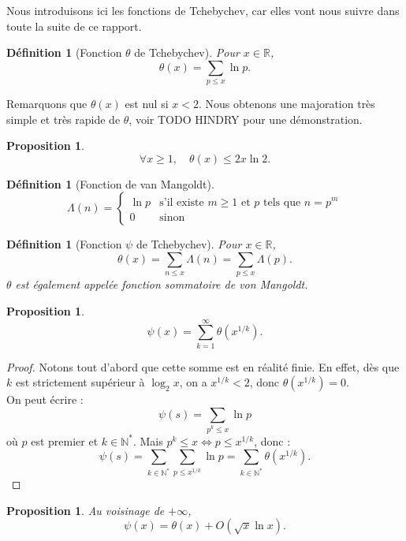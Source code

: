 \documentclass[french]{report}
\newtheorem{definition}[theorem]{Définition}
\newtheorem{proposition}[theorem]{Proposition}
\begin{document}
Nous introduisons ici les fonctions de Tchebychev, car elles vont nous suivre dans toute la suite de ce rapport.

\begin{definition}[Fonction $\theta$ de Tchebychev] Pour $x\in \mathbb{R}$,
  \[ \theta(x) = \sum_{p \le x}\ln p. \]
\end{definition}

Remarquons que $\theta(x)$ est nul si $x<2$. Nous obtenons une majoration très simple et très rapide de $\theta$, voir TODO HINDRY pour une démonstration.

\begin{proposition}\label{prop:theta-majoration}
  \[
    \forall x\geq1,\quad \theta(x)\leq 2x\ln 2.
  \]
\end{proposition}

\begin{definition}[Fonction de van Mangoldt]
  \[
    \Lambda(n)=
    \begin{cases}
      \ln p & \text{s'il existe $m\geq1$ et $p$ tels que $n=p^m$} \\
      0 & \text{sinon}
    \end{cases}
  \]
\end{definition}

\begin{definition}[Fonction $\psi$ de Tchebychev] Pour $x\in \mathbb{R}$,
  \[
    \theta(x)
    = \sum_{n \le x}\Lambda (n)
    = \sum_{p \le x}\Lambda (p).
  \]
  $\theta$ est également appelée fonction sommatoire de von Mangoldt.
\end{definition}

\begin{proposition}
  \[
    \psi(x) = \sum_{k=1}^{\infty}\theta(x^{1/k}).
  \]
\end{proposition}

\begin{proof}
  Notons tout d'abord que cette somme est en réalité finie. En effet, dès que $k$ est strictement supérieur à $\log_2 x$, on a $x^{1/k}<2$, donc $\theta(x^{1/k})=0$.
  \\

  On peut écrire :
  \[
    \psi(s) = \sum_{p^k\leq x}\ln p  
  \]
  où $p$ est premier et $k\in\mathbb{N}^*$. Mais $p^k\leq x\Leftrightarrow p\leq x^{1/k}$, donc :
  \[
    \psi(s)
    = \sum_{k\in\mathbb{N}^*}\sum_{p\leq x^{1/k}}\ln p 
    = \sum_{k\in\mathbb{N}^*}\theta(x^{1/k}).
  \]
\end{proof}

\begin{proposition}\label{prop:relation-psi-theta}
  Au voisinage de $+\infty$,
  \[
    \psi(x) = \theta(x) + O(\sqrt{x}\ln x).
  \]
\end{proposition}
\end{document}

